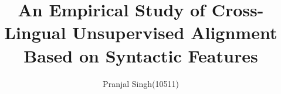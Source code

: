 \documentclass{article}
\title{\textbf{An Empirical Study of Cross-Lingual Unsupervised Alignment Based on Syntactic Features}}
\author{\normalsize Pranjal Singh(10511)\\}
\begin{document}
\maketitle

\nocite{*}


\end{document}
